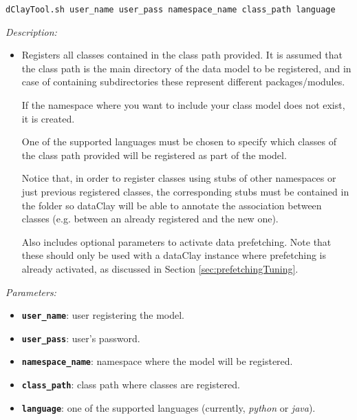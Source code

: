 
\begin{dBox}
\texttt{dClayTool.sh  \newline user\_name user\_pass namespace\_name class\_path language }
\LINE

{\it Description:}

\begin{itemize}
    \item Registers all classes contained in the class path provided. It is assumed that the class path is the main directory of the data model to be registered, and in case of containing subdirectories these represent different packages/modules.
    
    If the namespace where you want to include your class model does not exist, it is created.
    
    One of the supported languages must be chosen to specify which classes of the class path provided will be registered as part of the model.
    
    Notice that, in order to register classes using stubs of other namespaces or just previous registered classes, the corresponding stubs must be contained in the folder so dataClay will be able to annotate the association between classes (e.g. between an already registered and the new one).
    
    Also includes optional parameters to activate data prefetching. Note that these should only be used with a dataClay instance where prefetching is already activated, as discussed in Section \ref{sec:prefetchingTuning}.
\end{itemize}

{\it Parameters:}

\begin{itemize}
    \item \texttt{\bfseries user\_name}: user registering the model.
    \item \texttt{\bfseries user\_pass}: user's password.
    \item \texttt{\bfseries namespace\_name}: namespace where the model will be registered.
    \item \texttt{\bfseries class\_path}: class path where classes are registered.
    \item \texttt{\bfseries language}: one of the supported languages (currently, \textit{python} or \textit{java}).
\end{itemize}


\end{dBox}
